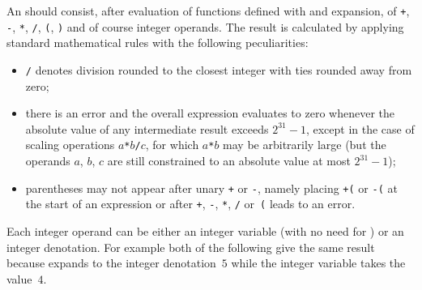 \documentclass[oneside]{book}
\begin{document}
An  should consist,
after evaluation of functions defined with 
and expansion, of \texttt{+}, \texttt{-}, \texttt{*}, \texttt{/},
\texttt{(}, \texttt{)} and of course integer operands.  The result
is calculated by applying standard mathematical rules with the
following peculiarities:
\begin{itemize}
\item \texttt{/} denotes division rounded to the closest integer with
ties rounded away from zero;
\item there is an error and the overall expression evaluates to zero
whenever the absolute value of any intermediate result exceeds
$2^{31}-1$, except in the case of scaling operations
$a$\texttt{*}$b$\texttt{/}$c$, for which $a$\texttt{*}$b$ may be
arbitrarily large (but the operands $a$, $b$, $c$ are still
constrained to an absolute value at most $2^{31}-1$);
\item parentheses may not appear after unary \texttt{+} or
\texttt{-}, namely placing \texttt{+(} or \texttt{-(} at the start
of an expression or after \texttt{+}, \texttt{-}, \texttt{*},
\texttt{/} or~\texttt{(} leads to an error.
\end{itemize}
Each integer operand can be either an integer variable (with no need
for ) or an integer denotation.
For example both of the following give the same result
because  expands to the integer denotation~$5$
while the integer variable  takes the value~$4$.
\begin{demohigh}
\end{demohigh}
\begin{demohigh}
\tlNew \lFooSomeTl
\tlSet {}
\intNew \lFooSomeInt
\intSet {}
\end{demohigh}

\end{document}
